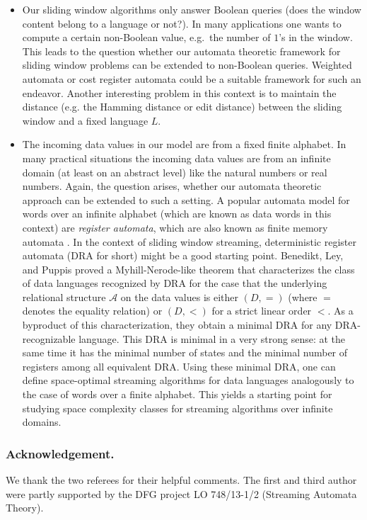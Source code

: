 \documentclass{theoretics}
\begin{document}
\begin{itemize}
\item Our sliding window algorithms only answer Boolean queries (does the window content belong to a language or not?).
In many applications one wants to compute a certain non-Boolean value, e.g.~the number of $1$'s in the window.
This leads to the question whether our automata theoretic framework for sliding window problems can be extended
to non-Boolean queries. Weighted automata \cite{DrosteKV09} or cost register automata \cite{AlurDDRY13} could be a suitable framework for such an endeavor. 
Another interesting problem in this context is to maintain the distance (e.g. the Hamming distance or edit distance) between the sliding window and a fixed language $L$.
\item The incoming data values in our model are from a fixed finite alphabet. In many practical situations the incoming
data values are from an infinite domain (at least on an abstract level) like the natural numbers or real numbers.
Again, the question arises, whether our automata theoretic approach can be extended to such a setting. 
A popular automata model for words over an infinite alphabet (which are known as data words in this context)
are {\em register automata}, which are also known as finite memory automata \cite{KaminskiF94,NevenSV04}.
In the context of sliding window streaming, deterministic register automata (DRA for short) \cite{FrancezK03} 
might be a good starting point. Benedikt, Ley, and Puppis
\cite{BenediktLP10} proved a Myhill-Nerode-like theorem that characterizes
the class of data languages recognized by DRA for the case that the underlying relational structure $\mathcal{A}$ 
on the data values is either $(D,=)$ (where $=$ denotes the equality relation) or $(D,<)$ for a strict linear order $<$.
As a byproduct of this characterization, they obtain a minimal DRA for any DRA-recognizable language. This DRA is minimal in a very strong 
sense: at the same time it has the minimal number of states and the minimal number of registers
among all equivalent DRA. Using these minimal DRA, one can define space-optimal streaming algorithms
for data languages analogously to the case of words over a finite alphabet. This yields a starting point for studying
space complexity classes for streaming algorithms over infinite domains. 
\end{itemize}

\subsubsection*{Acknowledgement.} We thank the two referees for their helpful comments. The first and third author were partly supported
by the DFG project LO 748/13-1/2 (Streaming Automata Theory).

\newpage
\printbibliography
	
\end{document}
